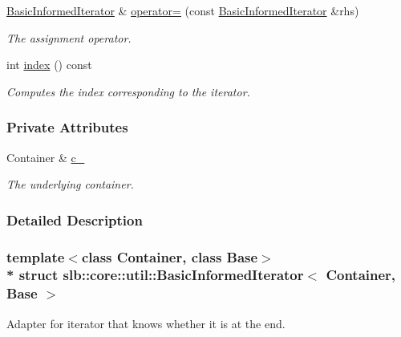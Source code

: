 \begin{DoxyCompactItemize}
\hyperlink{structslb_1_1core_1_1util_1_1BasicInformedIterator}{Basic\+Informed\+Iterator} \& \hyperlink{structslb_1_1core_1_1util_1_1BasicInformedIterator_a9f6c85b4389b4e023fb68c3817a22c4d}{operator=} (const \hyperlink{structslb_1_1core_1_1util_1_1BasicInformedIterator}{Basic\+Informed\+Iterator} \&rhs)
\begin{DoxyCompactList}\small\item\em The assignment operator. \end{DoxyCompactList}\item 
int \hyperlink{structslb_1_1core_1_1util_1_1BasicInformedIterator_a50d044b0f6b994f5bdd0e6fed3660f6e}{index} () const 
\begin{DoxyCompactList}\small\item\em Computes the index corresponding to the iterator. \end{DoxyCompactList}\end{DoxyCompactItemize}
\subsubsection*{Private Attributes}
\begin{DoxyCompactItemize}
\item 
Container \& \hyperlink{structslb_1_1core_1_1util_1_1BasicInformedIterator_a917c20e6bce46eb0666bd58c5371af53}{c\+\_\+}\hypertarget{structslb_1_1core_1_1util_1_1BasicInformedIterator_a917c20e6bce46eb0666bd58c5371af53}{}\label{structslb_1_1core_1_1util_1_1BasicInformedIterator_a917c20e6bce46eb0666bd58c5371af53}

\begin{DoxyCompactList}\small\item\em The underlying container. \end{DoxyCompactList}\end{DoxyCompactItemize}


\subsubsection{Detailed Description}
\subsubsection*{template$<$class Container, class Base$>$\\*
struct slb\+::core\+::util\+::\+Basic\+Informed\+Iterator$<$ Container, Base $>$}

Adapter for iterator that knows whether it is at the end. 


